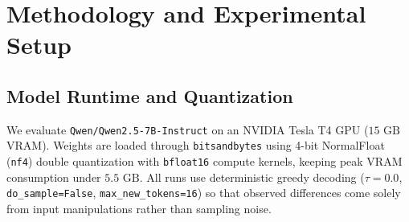\documentclass[10pt,twocolumn,letterpaper]{article}
\begin{document}
\section{Methodology and Experimental Setup}
\subsection{Model Runtime and Quantization}
We evaluate \texttt{Qwen/Qwen2.5-7B-Instruct} on an NVIDIA Tesla T4 GPU ($15\text{ GB}$ VRAM). Weights are loaded through \texttt{bitsandbytes} using 4-bit NormalFloat (\texttt{nf4}) double quantization with \texttt{bfloat16} compute kernels, keeping peak VRAM consumption under $5.5\text{ GB}$. All runs use deterministic greedy decoding ($\tau = 0.0$, \texttt{do\_sample=False}, \texttt{max\_new\_tokens=16}) so that observed differences come solely from input manipulations rather than sampling noise.
\end{document}
